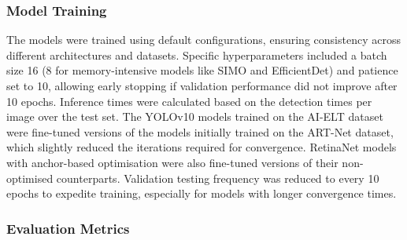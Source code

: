 

\subsubsection{Model Training}

The models were trained using default configurations, ensuring consistency across different architectures and datasets. Specific hyperparameters included a batch size 16 (8 for memory-intensive models like SIMO and EfficientDet) and patience set to 10, allowing early stopping if validation performance did not improve after 10 epochs. Inference times were calculated based on the detection times per image over the test set. The YOLOv10 models trained on the AI-ELT dataset were fine-tuned versions of the models initially trained on the ART-Net dataset, which slightly reduced the iterations required for convergence. RetinaNet models with anchor-based optimisation were also fine-tuned versions of their non-optimised counterparts. Validation testing frequency was reduced to every 10 epochs to expedite training, especially for models with longer convergence times.


\subsubsection{Evaluation Metrics}

